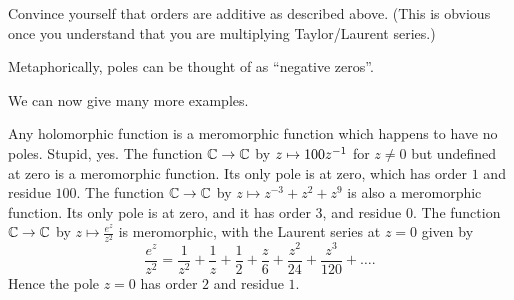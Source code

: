 \begin{exercise}
	Convince yourself that orders are additive as described above.
	(This is obvious once you understand that you
	are multiplying Taylor/Laurent series.)
\end{exercise}

Metaphorically, poles can be thought of as ``negative zeros''.


We can now give many more examples.
\begin{example}
	\listhack
	\begin{enumerate}[(a)]
		\ii Any holomorphic function is a meromorphic function which happens to have no poles.
		Stupid, yes.
		\ii The function $\mathbb C \to \mathbb C$ by $z \mapsto 100z^{-1}$ for $z \neq 0$
		but undefined at zero is a meromorphic function.
		Its only pole is at zero, which has order $1$ and residue $100$.
		\ii The function $\mathbb C \to \mathbb C$ by $z \mapsto z^{-3} + z^2 + z^9$ is also a meromorphic function.
		Its only pole is at zero, and it has order $3$, and residue $0$.
		\ii The function $\mathbb C \to \mathbb C$ by $z \mapsto \frac{e^z}{z^2}$ is meromorphic,
		with the Laurent series at $z=0$ given by
		\[
			\frac{e^z}{z^2}
			= \frac{1}{z^2} + \frac{1}{z} + \frac{1}{2} + \frac{z}{6} + \frac{z^2}{24} + \frac{z^3}{120}
			+ \dots.
		\]
		Hence the pole $z=0$ has order $2$ and residue $1$.
	\end{enumerate}
\end{example}

